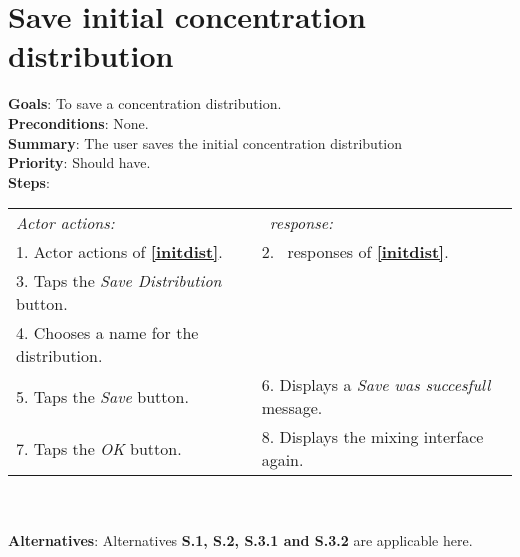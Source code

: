   \section{Save initial concentration distribution}
  \label{savedist}
  \textbf{Goals}: To save a concentration distribution.\\
  \textbf{Preconditions}: None. \\ %
  \textbf{Summary}: The user saves the initial concentration distribution\\
  \textbf{Priority}: Should have.\\
  \textbf{Steps}: \\
  \begin{tabular}{ p{} p{} }
  	\emph{Actor actions:} & \emph{\projectname\ response:} \\
  	1. Actor actions of \textbf{\ref{initdist}}. & 2. \projectname\ responses of \textbf{\ref{initdist}}. \\
    3. Taps the \emph{Save Distribution} button.  & \\
    4. Chooses a name for the distribution. & \\
    5. Taps the \emph{Save} button. & 6. Displays a \emph{Save was succesfull} message.\\
    7. Taps the \emph{OK} button. & 8. Displays the mixing interface again. \\
    \end{tabular}
    	 \\
    \\\textbf{Alternatives}: Alternatives \textbf{S.1, S.2, S.3.1 and S.3.2} are applicable here.
    
